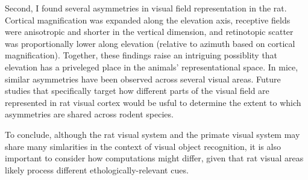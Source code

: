 Second, I found several asymmetries in visual field representation in the rat. Cortical magnification was expanded along the elevation axis, receptive fields were anisotropic and shorter in the vertical dimension, and retinotopic scatter was proportionally lower along elevation (relative to azimuth based on cortical magnification). Together, these findings raise an intriguing possiblity that elevation has a priveleged place in the animals' representational space. In mice, similar asymmetries have been observed across several visual areas\cite{Bonin2011, Juavinett2017, Liang2018, Sit2020}. Future studies that specifically target how different parts of the visual field are represented in rat visual cortex would be usful to determine the extent to which asymmetries are shared across rodent species.

To conclude, although the rat visual system and the primate visual system may share many simlarities in the context of visual object recognition, it is also important to consider how computations might differ, given that rat visual areas likely process different ethologically-relevant cues. 




